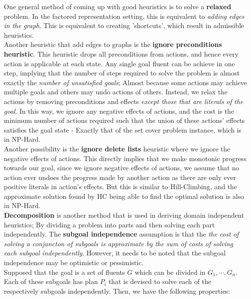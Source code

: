 \documentclass[11pt]{article}
\begin{document}
One general method of coming up with good heuristics is to solve a \textbf{relaxed} problem. In the factored representation setting, this is equivalent to \textit{adding edges in the graph}. This is equivalent to creating 'shortcuts', which result in admissible heuristics.\\

Another heuristic that add edges to graphs is the \textbf{ignore preconditions heuristic}. This heuristic drops all preconditions from actions, and hence every action is applicable at each state. Any single goal fluent can be achieve in one step, implying that the number of steps required to solve the problem is almost exactly the \textit{number of unsatisfied goals}; Almost because some actions may achieve multiple goals and others may undo actions of others. Instead, we relax the actions by removing preconditions and effects \textit{except those that are literals of the goal}. In this way, we ignore any negative effects of actions, and the cost is the minimum number of actions required such that the union of these actions' effects satisfies the goal state - Exactly that of the set cover problem instance, which is in NP-Hard.\\

Another possibility is the \textbf{ignore delete lists} heuristic where we ignore the negative effects of actions. This directly implies that we make monotonic progress towards our goal, since we ignore negative effects of actions, we assume that no action ever undoes the progress made by another action as there are only ever positive literals in action's effects. But this is similar to Hill-Climbing, and the approximate solution found by HC being able to find the optimal solution is also in NP-Hard.\\

\textbf{Decomposition} is another method that is used in deriving domain independent heuristics; By dividing a problem into parts and then solving each part independently. The \textbf{subgoal independence} assumption is that the \textit{the cost of solving a conjuncton of subgoals is approximate by the sum of costs of solving each subgoal independently}. However, it needs to be noted that the subgoal independence may be optimistic or pessimistic.\\

Supposed that the goal is a set of fluents $G$ which can be divided in $G_1,\cdots, G_n$. Each of these subgoals has plan $P_i$ that is devised to solve each of the respectively subgoals independently. Then, we have the following properties:
\end{document}
